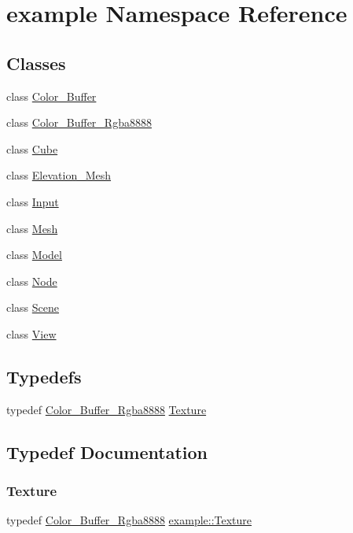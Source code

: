 \hypertarget{namespaceexample}{}\section{example Namespace Reference}
\label{namespaceexample}
\subsection*{Classes}
\begin{DoxyCompactItemize}
\item 
class \mbox{\hyperlink{classexample_1_1_color___buffer}{Color\+\_\+\+Buffer}}
\item 
class \mbox{\hyperlink{classexample_1_1_color___buffer___rgba8888}{Color\+\_\+\+Buffer\+\_\+\+Rgba8888}}
\item 
class \mbox{\hyperlink{classexample_1_1_cube}{Cube}}
\item 
class \mbox{\hyperlink{classexample_1_1_elevation___mesh}{Elevation\+\_\+\+Mesh}}
\item 
class \mbox{\hyperlink{classexample_1_1_input}{Input}}
\item 
class \mbox{\hyperlink{classexample_1_1_mesh}{Mesh}}
\item 
class \mbox{\hyperlink{classexample_1_1_model}{Model}}
\item 
class \mbox{\hyperlink{classexample_1_1_node}{Node}}
\item 
class \mbox{\hyperlink{classexample_1_1_scene}{Scene}}
\item 
class \mbox{\hyperlink{classexample_1_1_view}{View}}
\end{DoxyCompactItemize}
\subsection*{Typedefs}
\begin{DoxyCompactItemize}
\item 
typedef \mbox{\hyperlink{classexample_1_1_color___buffer___rgba8888}{Color\+\_\+\+Buffer\+\_\+\+Rgba8888}} \mbox{\hyperlink{namespaceexample_a4e4424d0fb5b457e8c00b8a7cdaad0e6}{Texture}}
\end{DoxyCompactItemize}


\subsection{Typedef Documentation}
\mbox{\label{namespaceexample_a4e4424d0fb5b457e8c00b8a7cdaad0e6}} 
\subsubsection{\texorpdfstring{Texture}{Texture}}
{\footnotesize\ttfamily typedef \mbox{\hyperlink{classexample_1_1_color___buffer___rgba8888}{Color\+\_\+\+Buffer\+\_\+\+Rgba8888}} \mbox{\hyperlink{namespaceexample_a4e4424d0fb5b457e8c00b8a7cdaad0e6}{example\+::\+Texture}}}


